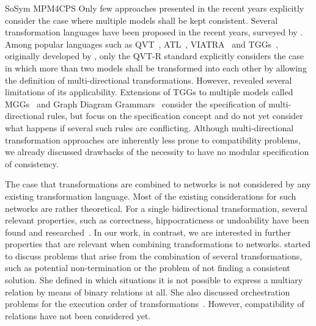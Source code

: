 \begin{copiedFrom}{SoSym MPM4CPS}
Only few approaches presented in the recent years explicitly consider the case where multiple models shall be kept consistent.
Several transformation languages have been proposed in the recent years, surveyed by \textcite{etzlstorfer2013SurveyIncrementalTransformation-ME}.
Among popular languages such as QVT~\cite{qvt}, \ac{ATL}~\cite{jouault2006a,xiong2007a}, VIATRA~\cite{bergmann2015viatra} and \acp{TGG}~\cite{anjorin2014b,anjorin2014c}, originally developed by \textcite{schuerr1995a}, only the QVT-R standard explicitly considers the case in which more than two models shall be transformed into each other by allowing the definition of multi-directional transformations.
However, \textcite{macedo2014FrameworkMultiDirectional-BX} revealed several limitations of its applicability.
Extensions of \acp{TGG} to multiple models called \acp{MGG}~\cite{konigs2006sosym} and Graph Diagram Grammars~\cite{trollmann2015TransformationTGGtoMultiModel-ICMT, trollmann2016SynchronizationTGGtoMultiModel-ICMT} consider the specification of multi-directional rules, but focus on the specification concept and do not yet consider what happens if several such rules are conflicting.
Although multi-directional transformation approaches are inherently less prone to compatibility problems, we already discussed drawbacks of the necessity to have no modular specification of consistency.

The case that transformations are combined to networks is not considered by any existing transformation language.
Most of the existing considerations for such networks are rather theoretical.
For a single bidirectional transformation, several relevant properties, such as correctness, hippocraticness or undoability have been found and researched~\cite{stevens2010sosym}.
In our work, in contrast, we are interested in further properties that are relevant when combining transformations to networks.
\textcite{stevens2020BidirectionalTransformationLarge-SoSym} started to discuss problems that arise from the combination of several transformations, such as potential non-termination or the problem of not finding a consistent solution. She defined in which situations it is not possible to express a multiary relation by means of binary relations at all.
She also discussed orchestration problems for the execution order of transformations~\cite{stevens2020BuildingFromMegamodels-SoSym}.
However, compatibility of relations %
have not been considered yet.


\end{copiedFrom}
